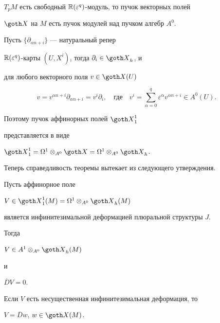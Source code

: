 $T_pM$ есть свободный $\Bbb R(\varepsilon^q)$-модуль, то пучок векторных полей


$\goth X$ на $M$ есть пучок модулей над пучком алгебр $A^0$.


Пусть $\{\partial_{\alpha n + i}\}$ --- натуральный репер


$\Bbb R(\varepsilon^q)$-карты $(U,X^i)$, тогда $\partial_i \in {\goth X}_h$, и


для любого векторного поля $v \in {\goth X}(U)$


$$


v = v^{\alpha n + i}\partial_{\alpha n + i} =


v^i \partial_i,


\quad \text{где}\quad


v^i = \sum_{\alpha = 0}^q \varepsilon^\alpha v^{\alpha n + i}


\in A^0(U).


$$


Поэтому пучок аффинорных полей ${\goth X}^1_1$


представляется в виде


${\goth X}^1_1 = \Omega^1\otimes_{A^0}{\goth X} =


\Omega^1\otimes_{A^0}{\goth X}_h$.





Теперь справедливость теоремы вытекает из следующего утверждения.





\begin{assrt}


Пусть аффинорное поле


$V \in {\goth X}^1_1(M) =\Omega^1\otimes_{A^0}{\goth X}_h(M)$


является инфинитезимальной деформацией плюральной структуры $J$.


Тогда


$V \in A^1\otimes_{A^0}{\goth X}_h(M)$


и


$\overline D V = 0$.





Если $V$ есть несущественная инфинитезимальная деформация, то


$V = \overline D w$, $w \in {\goth X}(M)$.


\end{assrt}


\medskip





